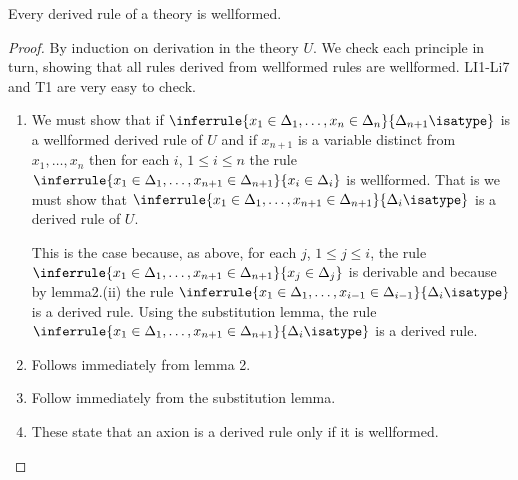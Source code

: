 \begin{lemma}
  Every derived rule of a theory is wellformed.
\end{lemma}
\begin{proof}
  By induction on derivation in the theory $U$.
  We check each principle in turn, showing that all rules derived from wellformed rules are wellformed.
  LI1-Li7 and T1 are very easy to check.

  \begin{enumerate}
    \item[CF1.] We must show that if $\inferrule{x_1\in\Delta_1,\ldots,x_n\in\Delta_n}{\Delta_{n+1}\isatype}$ is a wellformed derived rule of $U$ and if $x_{n+1}$ is a variable distinct from $x_1,\ldots,x_n$ then for each $i$, $1\leq i\leq n$ the rule $\inferrule{x_1\in\Delta_1,\ldots,x_{n+1}\in\Delta_{n+1}}{x_i\in\Delta_i}$ is wellformed.
      That is we must show that $\inferrule{x_1\in\Delta_1,\ldots,x_{n+1}\in\Delta_{n+1}}{\Delta_i\isatype}$ is a derived rule of $U$.

      This is the case because, as above, for each $j$, $1\leq j\leq i$, the rule $\inferrule{x_1\in\Delta_1,\ldots,x_{n+1}\in\Delta_{n+1}}{x_j\in\Delta_j}$ is derivable and because by lemma2.(ii) the rule $\inferrule{x_1\in\Delta_1,\ldots,x_{i-1}\in\Delta_{i-1}}{\Delta_i\isatype}$ is a derived rule. Using the substitution lemma, the rule $\inferrule{x_1\in\Delta_1,\ldots,x_{n+1}\in\Delta_{n+1}}{\Delta_i\isatype}$ is a derived rule.

    \item[CF2(a).] Follows immediately from lemma 2.

    \item[CF2(b), SI1 and SI2.] Follow immediately from the substitution lemma.

    \item[A1 and A2.] These state that an axion is a derived rule only if it is wellformed.
  \end{enumerate}
\end{proof}


